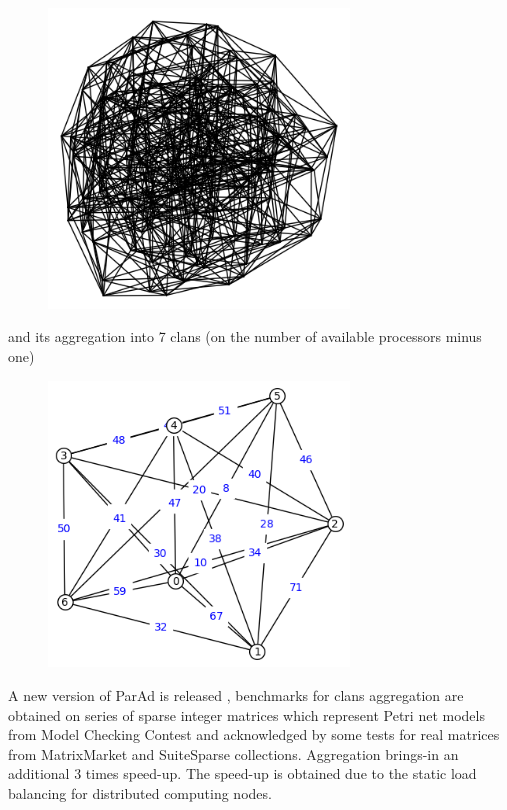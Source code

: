 \documentclass[10pt, a5paper]{article}
\begin{document}
\begin{center}
\begin{figure}[h!]
  \centering
  \includegraphics[width=8cm]{Zaitsev2.png}

  \label{fig1}
\end{figure}
\end{center}

\noindent and its aggregation into 7 clans (on the number of available processors minus one)

\begin{center}
\begin{figure}[h!]
  \centering
  \includegraphics[width=8cm]{Zaitsev3.png}

  \label{fig1}
\end{figure}
\end{center}

A new version of ParAd is released \cite{bib3}, benchmarks for clans \linebreak aggregation are obtained on series of sparse integer matrices which represent Petri net models from Model Checking Contest and \linebreak acknowledged by some tests for real matrices from MatrixMarket and SuiteSparse collections. Aggregation brings-in an additional 3 times speed-up. The speed-up is obtained due to the static load balancing for distributed computing nodes.
\end{document}

